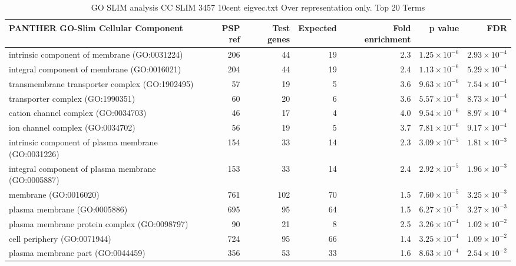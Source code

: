 \begin{table}[ht]
\centering
\begin{adjustbox}{width=\textwidth}

\begin{tabular}{lrrrrrr}
  \hline
PANTHER GO-Slim Cellular Component & PSP ref & Test genes & Expected & Fold enrichment & p value & FDR \\ 
  \hline
intrinsic component of membrane (GO:0031224) & 206 & 44 & 19 & 2.3 & $1.25 \times 10^{-6}$ & $2.93 \times 10^{-4}$ \\ 
  integral component of membrane (GO:0016021) & 204 & 44 & 19 & 2.4 & $1.13 \times 10^{-6}$ & $5.29 \times 10^{-4}$ \\ 
  transmembrane transporter complex (GO:1902495) & 57 & 19 & 5 & 3.6 & $9.63 \times 10^{-6}$ & $7.54 \times 10^{-4}$ \\ 
  transporter complex (GO:1990351) & 60 & 20 & 6 & 3.6 & $5.57 \times 10^{-6}$ & $8.73 \times 10^{-4}$ \\ 
  cation channel complex (GO:0034703) & 46 & 17 & 4 & 4.0 & $9.54 \times 10^{-6}$ & $8.97 \times 10^{-4}$ \\ 
  ion channel complex (GO:0034702) & 56 & 19 & 5 & 3.7 & $7.81 \times 10^{-6}$ & $9.17 \times 10^{-4}$ \\ 
  intrinsic component of plasma membrane (GO:0031226) & 154 & 33 & 14 & 2.3 & $3.09 \times 10^{-5}$ & $1.81 \times 10^{-3}$ \\ 
  integral component of plasma membrane (GO:0005887) & 153 & 33 & 14 & 2.4 & $2.92 \times 10^{-5}$ & $1.96 \times 10^{-3}$ \\ 
  membrane (GO:0016020) & 761 & 102 & 70 & 1.5 & $7.60 \times 10^{-5}$ & $3.25 \times 10^{-3}$ \\ 
  plasma membrane (GO:0005886) & 695 & 95 & 64 & 1.5 & $6.27 \times 10^{-5}$ & $3.27 \times 10^{-3}$ \\ 
  plasma membrane protein complex (GO:0098797) & 90 & 21 & 8 & 2.5 & $3.26 \times 10^{-4}$ & $1.02 \times 10^{-2}$ \\ 
  cell periphery (GO:0071944) & 724 & 95 & 66 & 1.4 & $3.25 \times 10^{-4}$ & $1.09 \times 10^{-2}$ \\ 
  plasma membrane part (GO:0044459) & 356 & 53 & 33 & 1.6 & $8.63 \times 10^{-4}$ & $2.54 \times 10^{-2}$ \\ 
   \hline
\end{tabular}
\end{adjustbox}
\caption{GO SLIM analysis CC SLIM 3457 10cent eigvec.txt Over representation only. Top 20 Terms} 
\label{tab:GO SLIM analysis CC SLIM 3457 10cent eigvec.txt Over representation only. Top 20 Terms}
\end{table}
\clearpage

